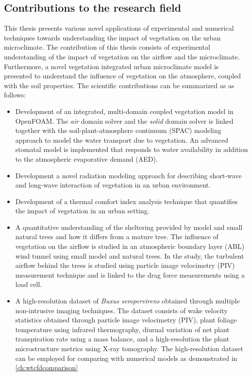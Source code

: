 \subsection{Contributions to the research field}

This thesis presents various novel applications of experimental and numerical techniques towards understanding the impact of vegetation on the urban microclimate. The contribution of this thesis consists of experimental understanding of the impact of vegetation on the airflow and the microclimate. Furthermore, a novel vegetation integrated urban microclimate model is presented to understand the influence of vegetation on the atmosphere, coupled with the soil properties. The scientific contributions can be summarized as as follows:

\begin{itemize}
	\item Development of an integrated, multi-domain coupled vegetation model in OpenFOAM. The \textit{air} domain solver and the \textit{solid} domain solver is linked together with the soil-plant-atmosphere continuum (SPAC) modeling approach to model the water transport due to vegetation. An advanced stomatal model is implemented that responds to water availability in addition to the atmospheric evaporative demand (AED).
	
	\item Development a novel radiation modeling approach for describing short-wave and long-wave interaction of vegetation in an urban environment.
	
	\item Development of a thermal comfort index analysis technique that quantifies the impact of vegetation in an urban setting.

	\item A quantitative understanding of the sheltering provided by model and small natural trees and how it differs from a mature tree. The influence of vegetation on the airflow is studied in an atmospheric boundary layer (ABL) wind tunnel using small model and natural trees. In the study, the turbulent airflow behind the trees is studied using particle image velocimetry (PIV) measurement technique and is linked to the drag force measurements using a load cell. 
	
	\item A high-resolution data\-set of \textit{Buxus sempervirens} obtained through multiple non-intrusive imaging techniques. The data\-set consists of wake velocity statistics obtained through particle image velocimetry (PIV), plant foliage temperature using infrared thermography, diurnal variation of net plant transpiration rate using a mass balance, and a high-resolution the plant microstructure metrics using  X-ray tomography. The high-resolution data\-set can be employed for comparing with numerical models as demonstrated in \cref{ch:wtcfdcomparison}


\end{itemize}
